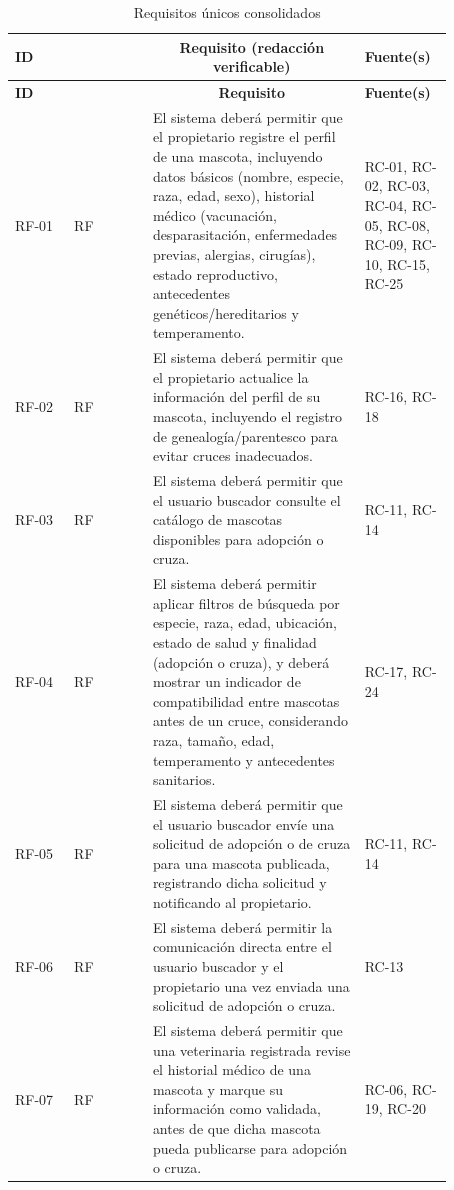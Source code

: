 \documentclass[journal,onecolumn]{IEEEtran}
\begin{document}
\begin{longtable}{| >{\centering\arraybackslash}p{0.12\linewidth} | >{\raggedright\arraybackslash}p{0.16\linewidth} | p{0.43\linewidth} | >{\raggedright\arraybackslash}p{0.16\linewidth} |}
	\caption{Requisitos únicos consolidados}
	\label{tab:req_unicos}\\
	\hline
	\textbf{ID} & \multicolumn{1}{c|}{\textbf{Tipo}} & \multicolumn{1}{c|}{\textbf{Requisito (redacción verificable)}} & \textbf{Fuente(s)} \\
	\hline
	\endfirsthead
	\hline
	\textbf{ID} & \multicolumn{1}{c|}{\textbf{Tipo}} & \multicolumn{1}{c|}{\textbf{Requisito}} & \textbf{Fuente(s)} \\
	\hline
	\endhead
	
	RF-01 & RF & El sistema deberá permitir que el propietario registre el perfil de una mascota, incluyendo datos básicos (nombre, especie, raza, edad, sexo), historial médico (vacunación, desparasitación, enfermedades previas, alergias, cirugías), estado reproductivo, antecedentes genéticos/hereditarios y temperamento. & RC-01, RC-02, RC-03, RC-04, RC-05, RC-08, RC-09, RC-10, RC-15, RC-25 \\
	\hline
	RF-02 & RF & El sistema deberá permitir que el propietario actualice la información del perfil de su mascota, incluyendo el registro de genealogía/parentesco para evitar cruces inadecuados. & RC-16, RC-18 \\
	\hline
	RF-03 & RF & El sistema deberá permitir que el usuario buscador consulte el catálogo de mascotas disponibles para adopción o cruza. & RC-11, RC-14 \\
	\hline
	RF-04 & RF & El sistema deberá permitir aplicar filtros de búsqueda por especie, raza, edad, ubicación, estado de salud y finalidad (adopción o cruza), y deberá mostrar un indicador de compatibilidad entre mascotas antes de un cruce, considerando raza, tamaño, edad, temperamento y antecedentes sanitarios. & RC-17, RC-24 \\
	\hline
	RF-05 & RF & El sistema deberá permitir que el usuario buscador envíe una solicitud de adopción o de cruza para una mascota publicada, registrando dicha solicitud y notificando al propietario. & RC-11, RC-14 \\
	\hline
	RF-06 & RF & El sistema deberá permitir la comunicación directa entre el usuario buscador y el propietario una vez enviada una solicitud de adopción o cruza. & RC-13 \\
	\hline
	RF-07 & RF & El sistema deberá permitir que una veterinaria registrada revise el historial médico de una mascota y marque su información como validada, antes de que dicha mascota pueda publicarse para adopción o cruza. & RC-06, RC-19, RC-20 \\

\end{longtable}
\end{document}
